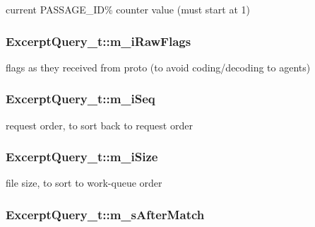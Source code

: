 current P\-A\-S\-S\-A\-G\-E\-\_\-\-I\-D\% counter value (must start at 1) 

\hypertarget{structExcerptQuery__t_a1b0e81cfad30a20be575602170481d3b}{
\subsubsection[{m\-\_\-i\-Raw\-Flags}]{ Excerpt\-Query\-\_\-t\-::m\-\_\-i\-Raw\-Flags}}\label{structExcerptQuery__t_a1b0e81cfad30a20be575602170481d3b}


flags as they received from proto (to avoid coding/decoding to agents) 

\hypertarget{structExcerptQuery__t_abff6d76f96153a0c67a1d3ef21975787}{
\subsubsection[{m\-\_\-i\-Seq}]{ Excerpt\-Query\-\_\-t\-::m\-\_\-i\-Seq}}\label{structExcerptQuery__t_abff6d76f96153a0c67a1d3ef21975787}


request order, to sort back to request order 

\hypertarget{structExcerptQuery__t_a0a99a80172a4c1191289e0327c2605eb}{
\subsubsection[{m\-\_\-i\-Size}]{ Excerpt\-Query\-\_\-t\-::m\-\_\-i\-Size}}\label{structExcerptQuery__t_a0a99a80172a4c1191289e0327c2605eb}


file size, to sort to work-\/queue order 

\hypertarget{structExcerptQuery__t_a518c251f53cfd982db1514fb6a978b26}{
\subsubsection[{m\-\_\-s\-After\-Match}]{ Excerpt\-Query\-\_\-t\-::m\-\_\-s\-After\-Match}}\label{structExcerptQuery__t_a518c251f53cfd982db1514fb6a978b26}


